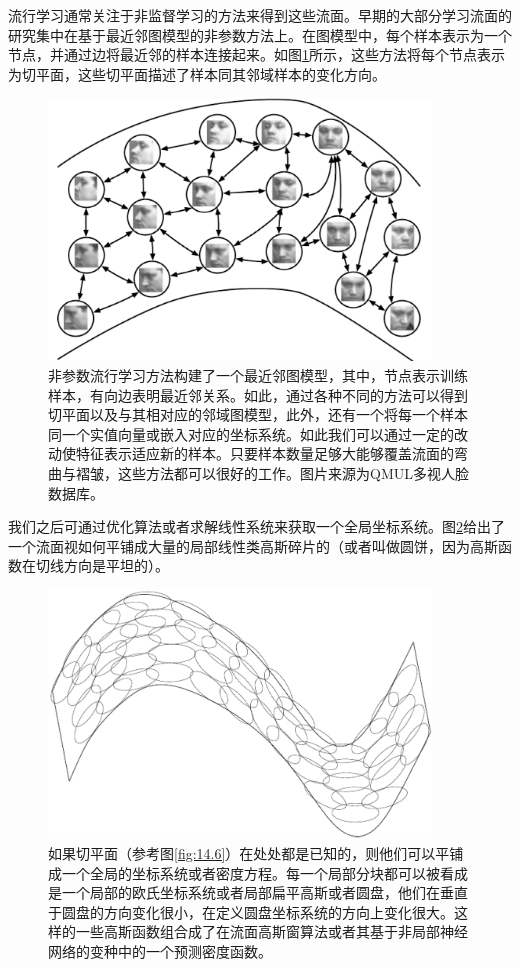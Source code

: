 流行学习通常关注于非监督学习的方法来得到这些流面。早期的大部分学习流面的研究集中在基于最近邻图模型的非参数方法上。在图模型中，每个样本表示为一个节点，并通过边将最近邻的样本连接起来。如图\ref{fig:14.8}所示，这些方法将每个节点表示为切平面，这些切平面描述了样本同其邻域样本的变化方向。
\begin{figure}[htbp] %
   \centering
   \includegraphics[width=4in]{fig/chap14/14_8.png} 
   \caption{非参数流行学习方法构建了一个最近邻图模型，其中，节点表示训练样本，有向边表明最近邻关系。如此，通过各种不同的方法可以得到切平面以及与其相对应的邻域图模型，此外，还有一个将每一个样本同一个实值向量或嵌入对应的坐标系统。如此我们可以通过一定的改动使特征表示适应新的样本。只要样本数量足够大能够覆盖流面的弯曲与褶皱，这些方法都可以很好的工作。图片来源为QMUL多视人脸数据库。}
   \label{fig:14.8}
\end{figure}

我们之后可通过优化算法或者求解线性系统来获取一个全局坐标系统。图\ref{fig:14.9}给出了一个流面视如何平铺成大量的局部线性类高斯碎片的（或者叫做圆饼，因为高斯函数在切线方向是平坦的）。
\begin{figure}[htbp] %
   \centering
   \includegraphics[width=4in]{fig/chap14/14_9.png} 
   \caption{如果切平面（参考图\ref{fig:14.6}）在处处都是已知的，则他们可以平铺成一个全局的坐标系统或者密度方程。每一个局部分块都可以被看成是一个局部的欧氏坐标系统或者局部扁平高斯或者圆盘，他们在垂直于圆盘的方向变化很小，在定义圆盘坐标系统的方向上变化很大。这样的一些高斯函数组合成了在流面高斯窗算法或者其基于非局部神经网络的变种中的一个预测密度函数。}
   \label{fig:14.9}
\end{figure}

